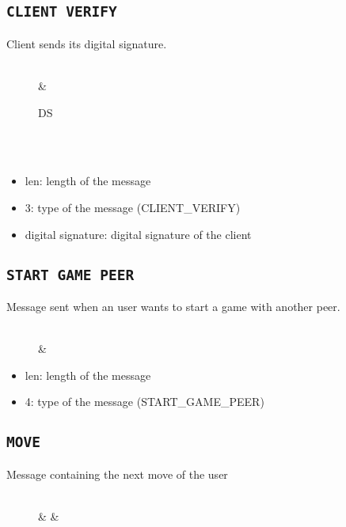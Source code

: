 \subsection{\texttt{CLIENT VERIFY}}
Client sends its digital signature.
\begin{figure}[h]
	\centering
	\begin{bytefield}[bitwidth=1.1em]{32}
		 \\
		&  \\
		\begin{rightwordgroup}{DS}
			 \\
			 \\
		\end{rightwordgroup} \\
	\end{bytefield}
\end{figure}

\begin{itemize}
	\item len: length of the message
	\item 3: type of the message (CLIENT\_VERIFY)
	\item digital signature: digital signature of the client
\end{itemize}

\subsection{\texttt{START GAME PEER}}
Message sent when an user wants to start a game with another peer.
\begin{figure}[h]
	\centering
	\begin{bytefield}[bitwidth=1.1em]{16}
		 \\
		& 
	\end{bytefield}
\end{figure}

\begin{itemize}
	\item len: length of the message
	\item 4: type of the message (START\_GAME\_PEER)
\end{itemize}

\subsection{\texttt{MOVE}}
Message containing the next move of the user
\begin{figure}[!htbp]
	\centering
	\begin{bytefield}[bitwidth=1.1em]{16}
		 \\
		& 
		& 
	\end{bytefield}
\end{figure}

